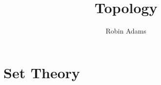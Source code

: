 \documentclass{report}
\title{Topology}
\author{Robin Adams}
\theoremstyle{definition}
\begin{document}
\maketitle

\tableofcontents

\part{Set Theory}












\end{document}
